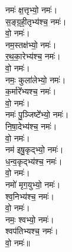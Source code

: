 \begin{multicols}{2}
\begin{flushleft}
नमः॑ क्ष॒त्तृभ्यो॒ नमः॑।\hfill {}\\
स॒ङ्ग्र॒ही॒तृभ्य॑श्च॒ नमः॑।\\
वो॒ नमः॑।\\
नम॒स्तक्ष॑भ्यो॒ नमः॑।\\
र॒थ॒का॒रेभ्य॑श्च॒ नमः॑।\\
वो॒ नमः॑।\\
नमः॒ कुला॑लेभ्यो॒ नमः॑।\\
क॒र्मारे᳚भ्यश्च॒ नमः॑।\\
वो॒ नमः॑।\\
नमः॑ पु॒ञ्जिष्टे᳚भ्यो॒ नमः॑।\\
नि॒षा॒देभ्य॑श्च॒ नमः॑।\hfill {}\\
वो॒ नमः॑।\\
नम॑ इषु॒कृद्भ्यो॒ नमः॑।\\
ध॒न्व॒कृद्भ्य॑श्च॒ नमः॑।\\
वो॒ नमः॑।\\
नमो॑ मृग॒युभ्यो॒ नमः॑।\\
श्व॒निभ्य॑श्च॒ नमः॑।\\
वो॒ नमः॑।\\
नमः॒ श्वभ्यो॒ नमः॑।\\
श्वप॑तिभ्यश्च॒ नमः॑।\\
वो॒ नमः॑॥\hfill {}\\


\end{flushleft}
\end{multicols}
